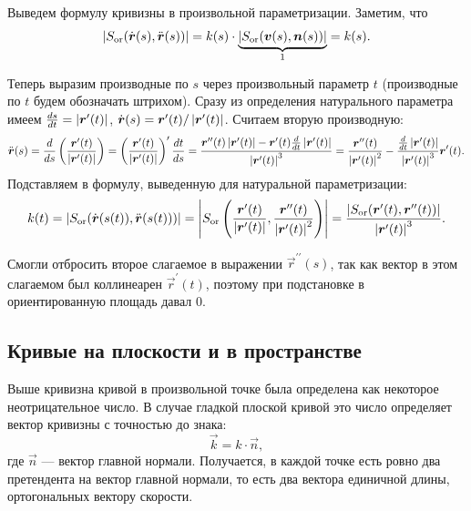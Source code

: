 Выведем формулу кривизны в произвольной параметризации. Заметим, что
\[
	\left\lvert S_{\mathrm{or}}(\dot{\boldsymbol{r}}(s), \ddot{\boldsymbol{r}}(s))\right\rvert = k(s) \cdot \underbrace{\left\lvert S_{\mathrm{or}}(\boldsymbol{v}(s), \boldsymbol{n}(s))\right\rvert}_1 = k(s).
\]

Теперь выразим производные по $s$ через произвольный параметр $t$ (производные по $t$ будем обозначать штрихом). Сразу из определения натурального параметра имеем $\frac{ds}{dt} \hm= \abs{\vec{r}^\prime(t)}$, $\dot{\boldsymbol{r}}(s) = \boldsymbol{r}^\prime(t) / \left\lvert\boldsymbol{r}^\prime(t)\right\rvert$. Считаем вторую производную:
\[
	\ddot{\boldsymbol{r}}(s) = \frac{d}{ds}\left(\frac{\boldsymbol{r}^\prime(t)}{\left\lvert\boldsymbol{r}^\prime(t)\right\rvert}\right) = \left(\frac{\boldsymbol{r}^\prime(t)}{\left\lvert\boldsymbol{r}^\prime(t)\right\rvert}\right)^\prime \frac{dt}{ds} = \frac{\boldsymbol{r}^{\prime\prime}(t) \left\lvert\boldsymbol{r}^\prime(t)\right\rvert - \boldsymbol{r}^\prime(t)\frac{d}{dt}\left\lvert\boldsymbol{r}^\prime(t)\right\rvert}{\left\lvert\boldsymbol{r}^\prime(t)\right\rvert^3} = \frac{\boldsymbol{r}^{\prime\prime}(t)}{\left\lvert\boldsymbol{r}^\prime(t)\right\rvert^2} - \frac{\frac{d}{dt}\left\lvert\boldsymbol{r}^\prime(t)\right\rvert}{\left\lvert\boldsymbol{r}^\prime(t)\right\rvert^3}\boldsymbol{r}^\prime(t).
\]
Подставляем в формулу, выведенную для натуральной параметризации:
\begin{equation} \label{eq:CurvatureFormula}
	k(t) = \left\lvert S_{\mathrm{or}}(\dot{\boldsymbol{r}}(s(t)), \ddot{\boldsymbol{r}}(s(t)))\right\rvert = \left\lvert S_{\mathrm{or}}\left(\frac{\boldsymbol{r}^\prime(t)}{\left\lvert\boldsymbol{r}^\prime(t)\right\rvert}, \frac{\boldsymbol{r}^{\prime\prime}(t)}{\left\lvert\boldsymbol{r}^{\prime}(t)\right\rvert^2}\right)\right\rvert = \frac{\left\lvert S_{\mathrm{or}}(\boldsymbol{r}^\prime(t), \boldsymbol{r}^{\prime\prime}(t))\right\rvert}{\left\lvert\boldsymbol{r}^\prime(t)\right\rvert^3}.
\end{equation}

Смогли отбросить второе слагаемое в выражении $\vec{r}^{\prime\prime}(s)$, так как вектор в этом слагаемом был коллинеарен $\vec{r}^\prime(t)$, поэтому при подстановке в ориентированную площадь давал $0$.

\subsection{Кривые на плоскости и в пространстве}

Выше кривизна кривой в произвольной точке была определена как некоторое неотрицательное число. В случае гладкой плоской кривой это число определяет вектор кривизны с точностью до знака:
\begin{equation} \label{eq:kn}
	\vec{k} = k \cdot \vec{n},
\end{equation}
где $\vec{n}$ --- вектор главной нормали. Получается, в каждой точке есть ровно два претендента на вектор главной нормали, то есть два вектора единичной длины, ортогональных вектору скорости.

